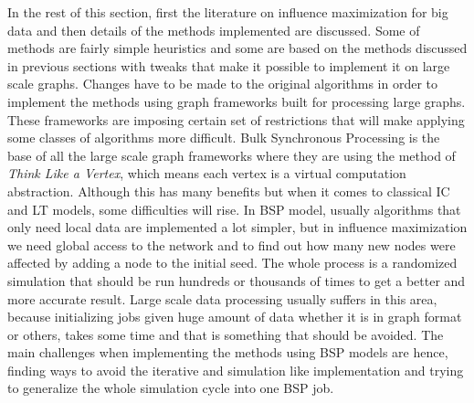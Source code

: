 \documentclass[english]{tktltiki}
\begin{document}
In the rest of this section, first the literature on influence maximization for big data and then details of the methods implemented are discussed. Some of methods are fairly simple heuristics and some are based on the methods discussed in previous sections with tweaks that make it possible to implement it on large scale graphs. Changes have to be made to the original algorithms in order to implement the methods using graph frameworks built for processing  large graphs. These frameworks are imposing certain set of restrictions that will make applying some classes of algorithms more difficult. Bulk Synchronous Processing is the base of all the large scale graph frameworks where they are using the method of \textit{Think Like a Vertex}, which means each vertex is a virtual computation abstraction. Although this has many benefits but when it comes to classical IC and LT models, some difficulties will rise. In BSP model, usually algorithms that only need local data are implemented a lot simpler, but in influence maximization we need global access to the network and to find out how many new nodes were affected by adding a node to the initial seed. The whole process is a randomized simulation that should be run hundreds or thousands of times to get a better and more accurate result. Large scale data processing usually suffers in this area, because initializing jobs given huge amount of data whether it is in graph format or others, takes some time and that is something that should be avoided. 
The main challenges when implementing the methods using BSP models are hence, finding ways to avoid the iterative and simulation like implementation and trying to generalize the whole simulation cycle into one BSP job.
\end{document}
